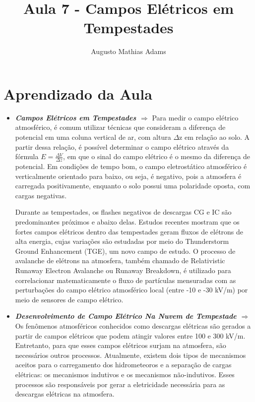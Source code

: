 \documentclass[a4paper, 12pt, onecolumn,singlespacing]{article}
\title{Aula 7 - Campos Elétricos em Tempestades }
\author[1]{Augusto Mathias Adams}
\affil[1]{augusto.adams@ufpr.br}
\begin{document}
	
	\maketitle
	
	\section{Aprendizado da Aula}
	
	\begin{itemize}
		
		\item \textbf{\textit{Campos Elétricos em Tempestades $\Rightarrow$ }}Para medir o campo elétrico atmosférico, é comum utilizar técnicas que consideram a diferença de potencial em uma coluna vertical de ar, com altura $\Delta$z em relação ao solo. A partir dessa relação, é possível determinar o campo elétrico através da fórmula $E = \frac{\Delta V}{\Delta z}$, em que o sinal do campo elétrico é o mesmo da diferença de potencial. Em condições de tempo bom, o campo eletrostático atmosférico é verticalmente orientado para baixo, ou seja, é negativo, pois a atmosfera é carregada positivamente, enquanto o solo possui uma polaridade oposta, com cargas negativas.
		
		Durante as tempestades, os flashes negativos de descargas CG e IC são predominantes próximos e abaixo delas. Estudos recentes mostram que os fortes campos elétricos dentro das tempestades geram fluxos de elétrons de alta energia, cujas variações são estudadas por meio do Thunderstorm Ground Enhancement (TGE), um novo campo de estudo. O processo de avalanche de elétrons na atmosfera, também chamado de Relativistic Runaway Electron Avalanche ou Runaway Breakdown, é utilizado para correlacionar matematicamente o fluxo de partículas mensuradas com as perturbações do campo elétrico atmosférico local (entre -10 e -30 kV/m) por meio de sensores de campo elétrico.
		
		\item \textbf{\textit{Desenvolvimento de Campo Elétrico Na Nuvem de Tempestade $\Rightarrow$ }} Os fenômenos atmosféricos conhecidos como descargas elétricas são gerados a partir de campos elétricos que podem atingir valores entre 100 e 300 kV/m. Entretanto, para que esses campos elétricos surjam na atmosfera, são necessários outros processos. Atualmente, existem dois tipos de mecanismos aceitos para o carregamento dos hidrometeoros e a separação de cargas elétricas: os mecanismos indutivos e os mecanismos não-indutivos. Esses processos são responsáveis por gerar a eletricidade necessária para as descargas elétricas na atmosfera.
		

\end{itemize}
\end{document}
